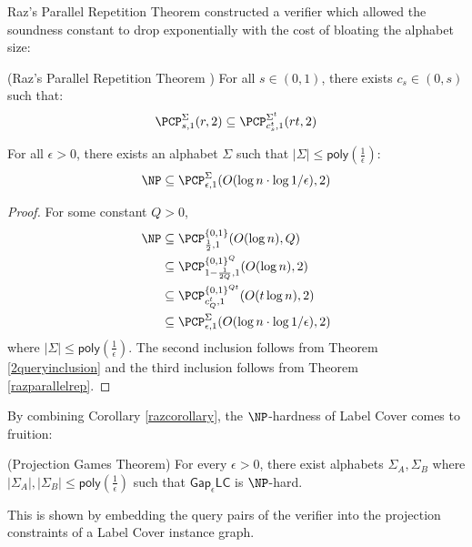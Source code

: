%
Raz's Parallel Repetition Theorem constructed a verifier which allowed the soundness constant to drop exponentially with the cost of bloating the alphabet size:
\begin{theorem} (Raz's Parallel Repetition Theorem \cite{raz1998parallel}) \label{razparallelrep}
  For all $s \in (0,1)$, there exists $c_s \in (0,s)$ such that:
    \[ \PCP^{\Sigma}_{s,1}(r,2) \subseteq \PCP^{\Sigma^t}_{c_s^t,1}(rt,2)  \]
\end{theorem}

\begin{corollary} \label{razcorollary} For all $\epsilon > 0$, there exists an alphabet $\Sigma$ such that $|\Sigma| \leq \mathsf{poly}(\frac{1}{\epsilon})$:
  $$ \NP \subseteq \PCP^{\Sigma}_{\epsilon,1}(O(\log{n}\cdot\log{1/\epsilon}),2) $$
\end{corollary}
%
\begin{proof}
  For some constant $Q > 0$,
  \begin{align*}
    \NP & \subseteq \PCP_{\frac{1}{2},1}^{\{0,1\}}(O(\log{n}), Q) \\
    & \subseteq \PCP_{1- \frac{1}{2Q},1}^{\{0,1\}^Q}(O(\log{n}), 2) \\
    & \subseteq \PCP_{c_Q^t,1}^{\{0,1\}^{Qt}}(O(t\log{n}), 2) \\
    & \subseteq   \PCP_{\epsilon,1}^{\Sigma}(O(\log{n}\cdot\log{1/\epsilon}), 2)
  \end{align*}
  where $|\Sigma| \leq \mathsf{poly}(\frac{1}{\epsilon})$. The second inclusion follows from Theorem \ref{2queryinclusion} and the third inclusion follows from Theorem \ref{razparallelrep}.
\end{proof}


By combining Corollary \ref{razcorollary}, the $\NP$-hardness of Label Cover comes to fruition:

\begin{theorem} (Projection Games Theorem) \label{labelcoverhard}
  For every $\epsilon > 0$, there exist alphabets $\Sigma_A, \Sigma_B$ where $|\Sigma_A|,|\Sigma_B| \leq \mathsf{poly}(\frac{1}{\epsilon})$ such that $\mathsf{Gap}_\epsilon\mathsf{LC}$ is $\NP$-hard.
\end{theorem}

This is shown by embedding the query pairs of the verifier into the projection constraints of a Label Cover instance graph.
